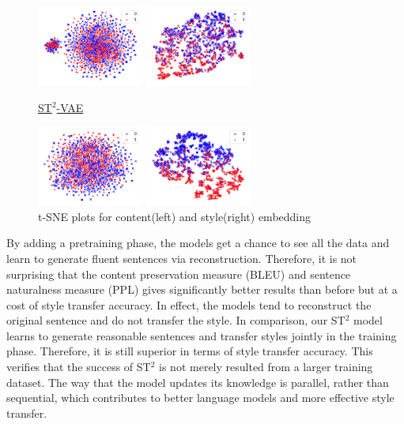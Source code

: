 \begin{figure}[t!]
\begin{minipage}{0.45\linewidth}
		\centering
		\includegraphics[width=3.5cm]{./images/vae_pre_c.pdf}
	\end{minipage}
	\begin{minipage}{0.45\linewidth}
		\centering
		\includegraphics[width=3.5cm]{./images/vae_pre_s.pdf}
	\end{minipage}
	\underline{\small ST$^2$-VAE}\\
	\begin{minipage}{0.45\linewidth}
		\centering
		\includegraphics[width=3.5cm]{./images/vae_maml_c.pdf}
	\end{minipage}
	\begin{minipage}{0.45\linewidth}
		\centering
		\includegraphics[width=3.5cm]{./images/vae_maml_s.pdf}
	\end{minipage}
	\caption{t-SNE plots for content(left) and style(right) embedding}\label{fig:tsne}
\end{figure}
By adding a pretraining phase, the models get a chance to see all the data and learn to generate fluent sentences via reconstruction. Therefore, it is not surprising that the content preservation measure (BLEU) and sentence naturalness measure (PPL) gives significantly better results than before but at a cost of style transfer accuracy. In effect, the models tend to reconstruct the original sentence and do not transfer the style. In comparison, our ST$^2$ model learns to generate reasonable sentences and transfer styles jointly in the training phase. Therefore, it is still superior in terms of style transfer accuracy. This verifies that the success of ST$^2$ is not merely resulted from a larger training dataset. The way that the model updates its knowledge is parallel, rather than sequential, which contributes to better language models and more effective style transfer.

